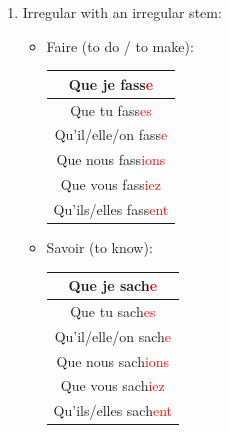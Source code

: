 \documentclass{book}
\begin{document}
\begin{enumerate}
            \item Irregular with an irregular stem:
                \begin{itemize}
                    \item Faire (to do / to make):
                        \begin{center}
                            \begin{tabular}{|c|}
                                \hline
                                Que je fass\textcolor{red}{e} \\
                                \hline
                                Que tu fass\textcolor{red}{es} \\
                                \hline
                                Qu'il/elle/on fass\textcolor{red}{e} \\
                                \hline
                                Que nous fass\textcolor{red}{ions} \\
                                \hline
                                Que vous fass\textcolor{red}{iez} \\
                                \hline
                                Qu'ils/elles fass\textcolor{red}{ent} \\
                                \hline
                            \end{tabular}
                        \end{center}

                    \item Savoir (to know):
                        \begin{center}
                            \begin{tabular}{|c|}
                                \hline
                                Que je sach\textcolor{red}{e} \\
                                \hline
                                Que tu sach\textcolor{red}{es} \\
                                \hline
                                Qu'il/elle/on sach\textcolor{red}{e} \\
                                \hline
                                Que nous sach\textcolor{red}{ions} \\
                                \hline
                                Que vous sach\textcolor{red}{iez} \\
                                \hline
                                Qu'ils/elles sach\textcolor{red}{ent} \\
                                \hline
                            \end{tabular}
                        \end{center}


\end{itemize}
\end{enumerate}
\end{document}
